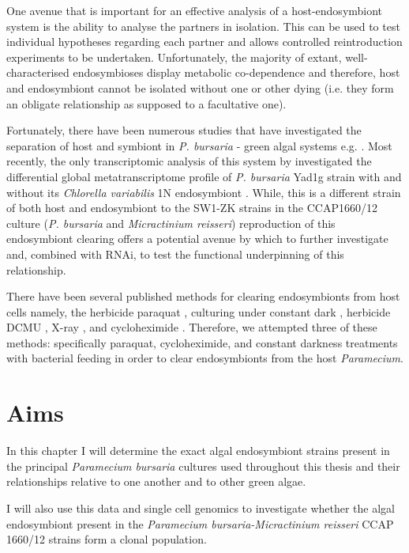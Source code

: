 One avenue that is important for an effective analysis of a host-endosymbiont
system is the ability to analyse the partners in isolation.  This can be used
to test individual hypotheses regarding each partner and  allows controlled
reintroduction experiments to be undertaken. 
Unfortunately,
the majority of extant, well-characterised endosymbioses display metabolic co-dependence
and therefore, host and endosymbiont cannot be isolated without one or other dying (i.e. they
form an obligate relationship as supposed to a facultative one). 

Fortunately, there have been numerous studies that have investigated the separation of 
host and symbiont in \textit{P. bursaria} - green algal systems e.g. \citep{Hosoya1995a,Achilles-Day2013,
Karakashian1963}. Most recently, the only transcriptomic analysis of this system by \citet{Kodama2014c}
investigated the differential global metatranscriptome profile of \textit{P. bursaria} Yad1g strain with 
 and without its \textit{Chlorella variabilis} 1N endosymbiont 
\citep{Kodama2014c}.   While, this is a different strain of both host and endosymbiont to the SW1-ZK 
strains in the CCAP1660/12 culture
(\textit{P. bursaria} and \textit{Micractinium reisseri}) reproduction of this endosymbiont
clearing offers a potential avenue by which to further investigate and, combined with RNAi, 
to test the functional underpinning of this relationship. 

There have been several published methods
for clearing endosymbionts from host cells namely, the herbicide paraquat \citep{Hosoya1995a}, 
culturing under constant dark \citep{Karakashian1963}, herbicide DCMU \citep{Kodama2009a},
X-ray \citep{Wichterman1948}, and cycloheximide \citep{weis1984effect,Kodama2007}.
Therefore, we attempted three of these methods: specifically paraquat, cycloheximide, and 
constant darkness treatments with bacterial feeding 
in order to clear endosymbionts from the host \textit{Paramecium}.

\section{Aims}

In this chapter I will determine the exact algal endosymbiont strains present
in the principal \textit{Paramecium bursaria} cultures used throughout
this thesis and their relationships relative to one another and to
other green algae. 

I will also use this data and single cell genomics to investigate whether the algal
endosymbiont present in the \textit{Paramecium bursaria-Micractinium reisseri}
CCAP 1660/12 strains form a clonal population. 

